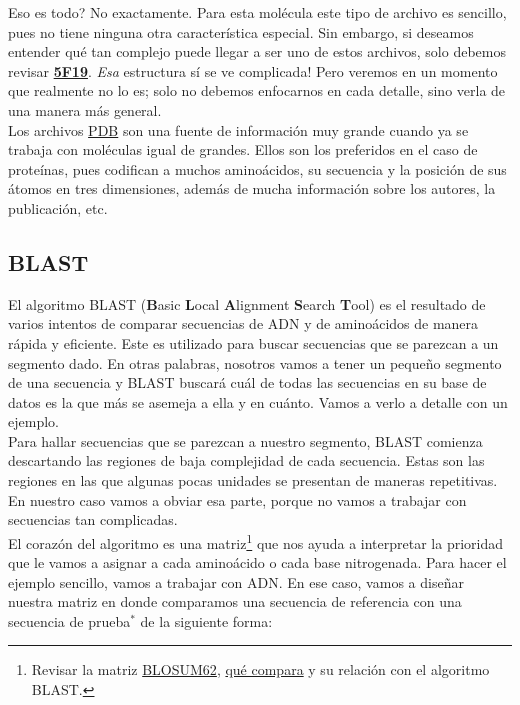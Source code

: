 \documentclass[10pt,letterpaper]{article}
\begin{document}
Eso es todo? No exactamente. Para esta mol\'ecula este tipo de archivo es sencillo, pues no tiene ninguna otra caracter\'istica especial. Sin embargo, si deseamos entender qu\'e tan complejo puede llegar a ser uno de estos archivos, solo debemos revisar \href{https://files.rcsb.org/view/5F19.pdb}{\textbf{5F19}}. \emph{Esa} estructura s\'i se ve complicada! Pero veremos en un momento que realmente no lo es; solo no debemos enfocarnos en cada detalle, sino verla de una manera m\'as general.\\

Los archivos \href{http://www.wwpdb.org/documentation/file-format-content/format33/v3.3.html}{PDB} son una fuente de informaci\'on muy grande cuando ya se trabaja con mol\'eculas igual de grandes. Ellos son los preferidos en el caso de prote\'inas, pues codifican a muchos amino\'acidos, su secuencia y la posici\'on de sus \'atomos en tres dimensiones, adem\'as de mucha informaci\'on sobre los autores, la publicaci\'on, etc.

\subsection{BLAST}
El algoritmo BLAST (\textbf{B}asic \textbf{L}ocal \textbf{A}lignment \textbf{S}earch \textbf{T}ool) es el resultado de varios intentos de comparar secuencias de ADN y de amino\'acidos de manera r\'apida y eficiente. Este es utilizado para buscar secuencias que se parezcan a un segmento dado. En otras palabras, nosotros vamos a tener un peque\~no segmento de una secuencia y BLAST buscar\'a cu\'al de todas las secuencias en su base de datos es la que m\'as se asemeja a ella y en cu\'anto. Vamos a verlo a detalle con un ejemplo.\\

Para hallar secuencias que se parezcan a nuestro segmento, BLAST comienza descartando las regiones de baja complejidad de cada secuencia. Estas son las regiones en las que algunas pocas unidades se presentan de maneras repetitivas. En nuestro caso vamos a obviar esa parte, porque no vamos a trabajar con secuencias tan complicadas.\\

El coraz\'on del algoritmo es una matriz\footnote{Revisar la matriz \href{https://www.ncbi.nlm.nih.gov/Class/FieldGuide/BLOSUM62.txt}{BLOSUM62}, \href{https://www.ncbi.nlm.nih.gov/pmc/articles/PMC50453/pdf/pnas01096-0363.pdf}{qu\'e compara} y su relaci\'on con el algoritmo BLAST.} que nos ayuda a interpretar la prioridad que le vamos a asignar a cada amino\'acido o cada base nitrogenada. Para hacer el ejemplo sencillo, vamos a trabajar con ADN. En ese caso, vamos a dise\~nar nuestra matriz en donde comparamos una secuencia de referencia con una secuencia de prueba$^{*}$ de la siguiente forma:
\end{document}
